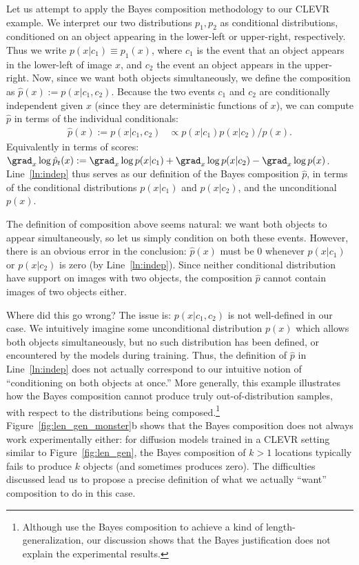 Let us attempt to apply the Bayes composition methodology to our CLEVR example.
We interpret our two distributions $p_1, p_2$ as conditional distributions,
conditioned on an object appearing in the lower-left or upper-right, respectively.
Thus we write $p(x|c_1) \equiv p_1(x)$, where $c_1$ is the event that
an object appears in the lower-left of image $x$, and
$c_2$ the event an object appears in the upper-right.
Now, since we want both objects simultaneously, we define the composition as
$\hat{p}(x) := p(x | c_1, c_2)$.
Because the two events $c_1$ and $c_2$ are conditionally independent given $x$
(since they are deterministic functions of $x$), we can compute $\hat{p}$
in terms of the individual conditionals:
\begin{align}
    \hat{p}(x) := p(x | c_1, c_2) %
    & \propto p(x|c_1) p(x | c_2) / p(x) .\label{ln:indep}
\end{align}
Equivalently in terms of scores: $\grad_x \log\hat{p}_t(x) := 
\grad_x \log p(x|c_1) + \grad_x \log p(x|c_2) - \grad_x \log{p}(x)$.
Line~\eqref{ln:indep} thus serves as our definition of the Bayes composition $\hat{p}$,
in terms of the conditional distributions $p(x|c_1)$ and $p(x|c_2)$,
and the unconditional $p(x)$.

The definition of composition above seems natural: we want both objects to appear simultaneously,
so let us simply condition on both these events.
However, there is an obvious error in the conclusion:
$\hat{p}(x)$ must be $0$ whenever $p(x|c_1)$ or $p(x|c_2)$ is zero (by Line~\ref{ln:indep}).
Since neither conditional distribution have support on images with two objects,
the composition $\hat{p}$ cannot contain images of two objects either.

Where did this go wrong?
The issue is: 
$p(x | c_1, c_2)$ is not well-defined in our case.
We intuitively imagine some unconditional distribution $p(x)$
which allows both objects simultaneously,
but no such distribution has been defined,
or encountered by the models during training.
Thus, the definition of $\hat{p}$
in Line~\eqref{ln:indep} does not actually
correspond to our intuitive notion of
``conditioning on both objects at once.''
More generally, this example illustrates how the Bayes composition cannot produce truly out-of-distribution samples, with respect to the distributions being composed.\footnote{
Although \citet{du2023reduce} use the Bayes composition
to achieve a kind of length-generalization, our discussion
shows that the Bayes justification does not 
explain the experimental results.}
Figure~\ref{fig:len_gen_monster}b shows that the Bayes composition does
not always work experimentally either:
for diffusion models trained in a CLEVR setting similar to Figure~\ref{fig:len_gen}, the Bayes composition of $k > 1$ locations typically fails to produce $k$ objects (and sometimes produces zero).
The difficulties discussed lead us to propose a
precise definition of what we actually ``want'' composition to do in this case.

